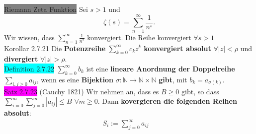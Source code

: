 \documentclass[landscape, 10pt]{article}
\newcommand{\N}{\mathbb{N}}
\begin{document}
\begin{multicols}{3}
              \colorbox{gray}{Riemann Zeta Funktion} 
                     Sei \textcolor{NavyBlue}{$s>1$} und 
                     \begin{equation*}
                            \zeta(s)=\sum_{n=1}^\infty\frac{1}{n^s}.
                     \end{equation*}
                     Wir wissen, dass
                     \textcolor{NavyBlue}{
                     $\sum_{n=1}^\infty\frac{1}{n^2}$} konvergiert.
                     Die Reihe konvergiert 
                     \textcolor{NavyBlue}{$\forall s>1$}\\
              \colorbox{BurntOrange}{Korollar 2.7.21}
                     Die \textbf{Potenzreihe}
                     \textcolor{NavyBlue}{$\sum_{k=0}^\infty c_kz^k$}
                     \textbf{konvergiert absolut} 
                     \textcolor{NavyBlue}{$\forall |z|<\rho$} und \textbf{divergiert} 
                     \textcolor{NavyBlue}{$\forall |z|>\rho$}.\\
              \colorbox{cyan}{Definition 2.7.22} 
                     \textcolor{NavyBlue}{$\sum_{k=0}^\infty b_k$}
                     ist eine \textbf{lineare Anordnung der Doppelreihe} 
                     \textcolor{NavyBlue}{$\sum_{i,j\geqslant0}a_{ij}$}, 
                     wenn es eine 
                     \textbf{Bijektion} 
                     \textcolor{NavyBlue}{$\sigma:\N\longrightarrow\N\times\N$}
                     \textbf{gibt}, mit 
                     \textcolor{NavyBlue}{$b_k=a_{\sigma(k)}$}.\\
              \colorbox{magenta}{Satz 2.7.23} 
              (Cauchy 1821) 
                     Wir nehmen an, dass es 
                     \textcolor{NavyBlue}{$B\geqslant0$} gibt, so dass 
                     \textcolor{NavyBlue}{
                     $\sum_{i=0}^m\sum_{j=0}^m|a_{ij}|\leqslant B$
                     \quad
                     $\forall m\geqslant0$}.
                     Dann 
                     \textbf{kovergieren die folgenden Reihen absolut}: 
                     \begin{align*}
                            S_i:=\sum_{j=0}^\infty a_{ij} \quad

\end{align*}
\end{multicols}
\end{document}
